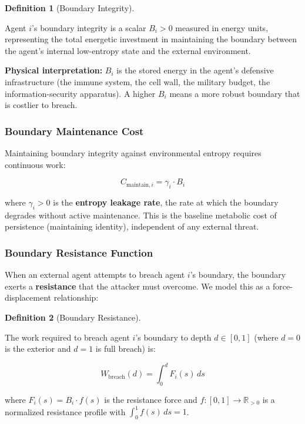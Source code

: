 \documentclass[11pt]{article}
\theoremstyle{plain}
\theoremstyle{definition}
\newtheorem{definition}{Definition}
\theoremstyle{remark}
\let\origsubsubsection\subsubsection
\renewcommand{\subsubsection}{\needspace{4\baselineskip}\origsubsubsection}
\begin{document}
\begin{definition}[Boundary Integrity]
\label{def-boundary-integrity}

Agent $i$'s boundary integrity is a scalar $B_i > 0$ measured in energy units, representing the total energetic investment in maintaining the boundary between the agent's internal low-entropy state and the external environment.
\end{definition}

\textbf{Physical interpretation:} \(B_i\) is the stored energy in the
agent's defensive infrastructure (the immune system, the cell wall, the
military budget, the information-security apparatus). A higher \(B_i\)
means a more robust boundary that is costlier to breach.

\subsubsection{Boundary Maintenance
Cost}\label{boundary-maintenance-cost}

Maintaining boundary integrity against environmental entropy requires
continuous work:

\[C_{\text{maintain},i} = \gamma_i \cdot B_i\]

where \(\gamma_i > 0\) is the \textbf{entropy leakage rate}, the rate at
which the boundary degrades without active maintenance. This is the
baseline metabolic cost of persistence (maintaining identity),
independent of any external threat.

\subsubsection{Boundary Resistance
Function}\label{boundary-resistance-function}

When an external agent attempts to breach agent \(i\)'s boundary, the
boundary exerts a \textbf{resistance} that the attacker must overcome.
We model this as a force-displacement relationship:

\begin{definition}[Boundary Resistance]
\label{def-boundary-resistance}

The work required to breach agent $i$'s boundary to depth $d \in [0, 1]$ (where $d = 0$ is the exterior and $d = 1$ is full breach) is:

$$W_{\text{breach}}(d) = \int_0^d F_i(s) \, ds$$

where $F_i(s) = B_i \cdot f(s)$ is the resistance force and $f : [0, 1] \to \mathbb{R}_{> 0}$ is a normalized resistance profile with $\int_0^1 f(s) \, ds = 1$.
\end{definition}
\end{document}
